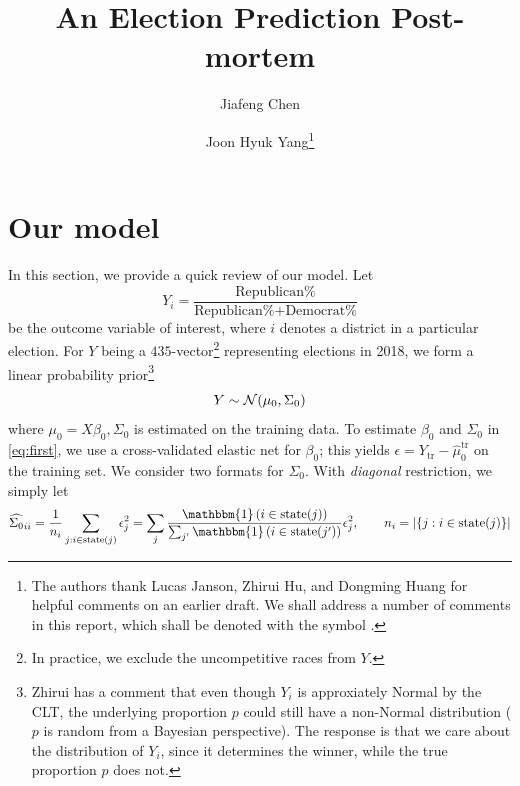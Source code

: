\documentclass[12pt]{article}
\title{\vspace{-1.5cm}\sffamily\bfseries{An Election Prediction Post-mortem}}
\author{\vspace{-.5cm}Jiafeng Chen \and Joon Hyuk Yang\thanks{The authors thank Lucas Janson, Zhirui Hu, and Dongming Huang for helpful comments on an earlier draft. We shall address a number of comments in this report, which shall be denoted with the symbol \cm.}}
\newcommand{\cm}{{\color{Red}{\textsf{[C]}}}}
\newcommand{\one}{\mathbbm{1}}
\begin{document}
\maketitle
\section{Our model}
\label{sec:intro}

In this section, we provide a quick review of our model. Let \begin{equation}
  Y_i = \frac{\text{Republican\%}}{\text{Republican\%}+\text{Democrat\%}}
  \label{eq:def_y}
\end{equation}
be the outcome variable of interest, where $i$ denotes a district in a particular election. For $Y$ being a $435$-vector\footnote{In practice, we exclude the uncompetitive races from $Y$.} representing elections in 2018, we form a linear probability prior\footnote{\cm{} Zhirui has a comment that even though $Y_i$ is approxiately Normal by the CLT, the underlying proportion $p$ could still have a non-Normal distribution ($p$ is random from a Bayesian perspective). The response is that we care about the distribution of $Y_i$, since it determines the winner, while the true proportion $p$ does not.} \begin{equation}
  Y \sim \mathcal{N}(\mu_0, \Sigma_0)\label{eq:first}
\end{equation}
where $\mu_0 = X\beta_0, \Sigma_0$ is estimated
on the training data. To estimate $\beta_0$ and $\Sigma_0$ in \eqref{eq:first}, we use a cross-validated elastic net for $\beta_0$; this yields $\epsilon = Y_{\text{tr}} - \hat \mu_0^{\text{tr}}$ on the training set. We consider two formats for $\Sigma_0$. With \emph{diagonal} restriction, we simply let 
\begin{equation}
  \hat {\Sigma_0}_{ii} = \frac{1}{n_i} \sum_{j : i\in\text{state}(j)} \epsilon_j^2 = \sum_j \frac{\one\pr{i\in\text{state}(j)}}{\sum_{j'} \one\pr{i\in\text{state}(j')}} \epsilon_j^2, \qquad n_i = |\{j : i\in\text{state}(j)\}|
\label{eq:diag_var}
\end{equation}
\end{document}
